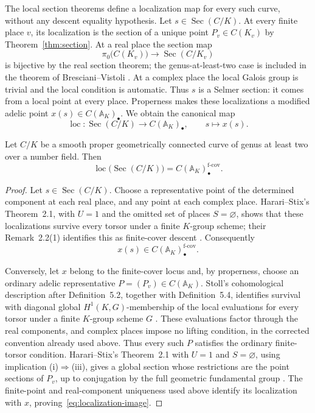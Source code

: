 The local section theorems define a localization map for every such
curve, without any descent equality hypothesis.
Let $s\in\operatorname{Sec}(C/K)$. At every finite place $v$, its
localization is the section of a unique point $P_v\in C(K_v)$ by
Theorem~\ref{thm:section}. At a real place the section map
\[
 \pi_0\bigl(C(K_v)\bigr)\longrightarrow\operatorname{Sec}(C/K_v)
\]
is bijective by the real section theorem; the genus-at-least-two case
is included in the theorem of Bresciani--Vistoli
\cite[Introduction, Theorem]{BrescianiVistoliReal}. At a complex place
the local Galois group is trivial and the local condition is automatic.
Thus $s$ is a Selmer section: it comes from a local point at every
place. Properness makes these localizations a modified adelic point
$x(s)\in C(\mathbb A_K)_\bullet$. We obtain the canonical map
\[
 \operatorname{loc}:\operatorname{Sec}(C/K)
 \longrightarrow C(\mathbb A_K)_\bullet,
 \qquad s\longmapsto x(s).
\]

\begin{proposition}\label{prop:localization-image}
Let $C/K$ be a smooth proper geometrically connected curve of genus at
least two over a number field. Then
\begin{equation}\label{eq:localization-image}
 \operatorname{loc}\bigl(\operatorname{Sec}(C/K)\bigr)
 =C(\mathbb A_K)_\bullet^{\mathrm{f\text{-}cov}}.
\end{equation}
\end{proposition}

\begin{proof}
Let $s\in\operatorname{Sec}(C/K)$.
Choose a representative point of the determined component at each
real place, and any point at each complex place. Harari--Stix's
Theorem~2.1, with $U=1$ and the omitted set of places $S=\varnothing$,
shows that these localizations survive every torsor under a finite
$K$-group scheme; their Remark~2.2(1) identifies this as finite-cover
descent \cite[preprint version, Theorem~2.1 and Remark~2.2(1)]{HarariStixFiniteDescent}.
Consequently
\[
 x(s)\in C(\mathbb A_K)_\bullet^{\mathrm{f\text{-}cov}}.
\]

Conversely, let $x$ belong to the
finite-cover locus and, by properness, choose an ordinary adelic
representative $P=(P_v)\in C(\mathbb A_K)$. Stoll's cohomological description after
Definition~5.2, together with Definition~5.4, identifies survival with
diagonal global $H^1(K,G)$-membership of the local evaluations for
every torsor under a finite $K$-group scheme $G$
\cite{StollFiniteDescent}. These evaluations factor through the real
components, and complex places impose no lifting condition, in the
corrected convention already used above. Thus every such $P$ satisfies
the ordinary finite-torsor condition. Harari--Stix's Theorem~2.1 with
$U=1$ and $S=\varnothing$, using implication (i)$\Rightarrow$(iii),
gives a global section whose restrictions are the point sections of
$P_v$, up to conjugation by the full geometric fundamental group
\cite[preprint version, Theorem~2.1 and Remark~2.2(1)]{HarariStixFiniteDescent}.
The finite-point and real-component uniqueness used above identify its
localization with $x$, proving~\eqref{eq:localization-image}.
\end{proof}

